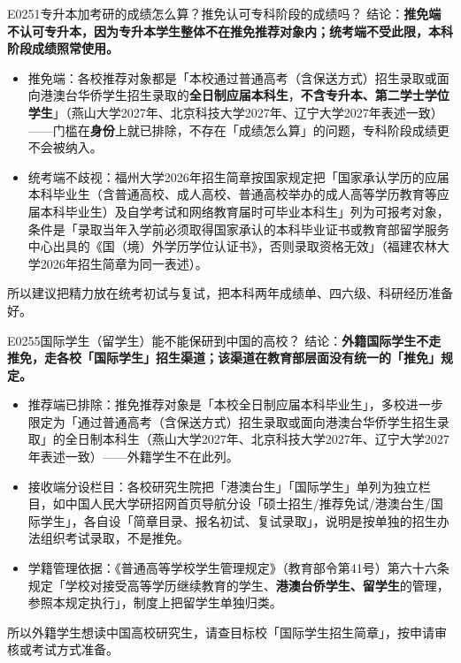 \begin{qa}{E0251}{专升本加考研的成绩怎么算？推免认可专科阶段的成绩吗？}
结论：\textbf{推免端不认可专升本，因为专升本学生整体不在推免推荐对象内；统考端不受此限，本科阶段成绩照常使用。}
\begin{itemize}
  \item 推免端：各校推荐对象都是「本校通过普通高考（含保送方式）招生录取或面向港澳台华侨学生招生录取的\textbf{全日制应届本科生}，\textbf{不含专升本、第二学士学位学生}」（燕山大学2027年、北京科技大学2027年、辽宁大学2027年表述一致）——门槛在\textbf{身份}上就已排除，不存在「成绩怎么算」的问题，专科阶段成绩更不会被纳入。
  \item 统考端不歧视：福州大学2026年招生简章按国家规定把「国家承认学历的应届本科毕业生（含普通高校、成人高校、普通高校举办的成人高等学历教育等应届本科毕业生）及自学考试和网络教育届时可毕业本科生」列为可报考对象，条件是「录取当年入学前必须取得国家承认的本科毕业证书或教育部留学服务中心出具的《国（境）外学历学位认证书》，否则录取资格无效」（福建农林大学2026年招生简章为同一表述）。
\end{itemize}
所以建议把精力放在统考初试与复试，把本科两年成绩单、四六级、科研经历准备好。
\end{qa}

\begin{qa}{E0255}{国际学生（留学生）能不能保研到中国的高校？}
结论：\textbf{外籍国际学生不走推免，走各校「国际学生」招生渠道；该渠道在教育部层面没有统一的「推免」规定。}
\begin{itemize}
  \item 推荐端已排除：推免推荐对象是「本校全日制应届本科毕业生」，多校进一步限定为「通过普通高考（含保送方式）招生录取或面向港澳台华侨学生招生录取」的全日制本科生（燕山大学2027年、北京科技大学2027年、辽宁大学2027年表述一致）——外籍学生不在此列。
  \item 接收端分设栏目：各校研究生院把「港澳台生」「国际学生」单列为独立栏目，如中国人民大学研招网首页导航分设「硕士招生/推荐免试/港澳台生/国际学生」，各自设「简章目录、报名初试、复试录取」，说明是按单独的招生办法组织考试录取，不是推免。
  \item 学籍管理依据：《普通高等学校学生管理规定》（教育部令第41号）第六十六条规定「学校对接受高等学历继续教育的学生、\textbf{港澳台侨学生、留学生}的管理，参照本规定执行」，制度上把留学生单独归类。
\end{itemize}
所以外籍学生想读中国高校研究生，请查目标校「国际学生招生简章」，按申请审核或考试方式准备。
\end{qa}

